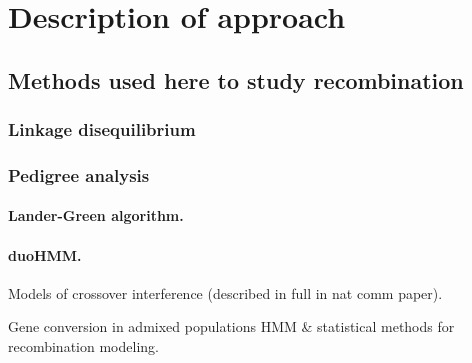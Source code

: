\section{Description of approach}

\subsection{Methods used here to study recombination}
\subsubsection{Linkage disequilibrium}
\subsubsection{Pedigree analysis}
\paragraph{Lander-Green algorithm.}
\paragraph{duoHMM.}

\begin{titemize}
    \item Models of crossover interference (described in full in nat comm paper).
    \item Gene conversion in admixed populations HMM \& statistical methods for recombination modeling.
\end{titemize}





